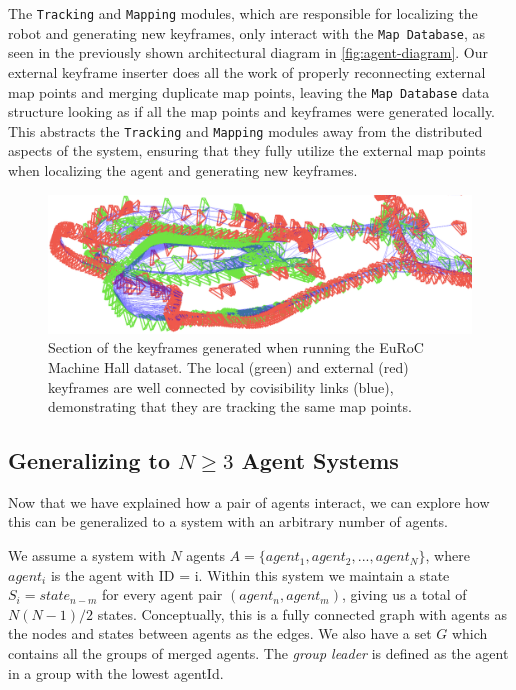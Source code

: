 The \texttt{Tracking} and \texttt{Mapping} modules, which are responsible for localizing the robot and generating new keyframes, only interact with the \texttt{Map Database}, as seen in the previously shown architectural diagram in \autoref{fig:agent-diagram}. Our external keyframe inserter does all the work of properly reconnecting external map points and merging duplicate map points, leaving the \texttt{Map Database} data structure looking as if all the map points and keyframes were generated locally. This abstracts the \texttt{Tracking} and \texttt{Mapping} modules away from the distributed aspects of the system, ensuring that they fully utilize the external map points when localizing the agent and generating new keyframes.


\begin{figure}[h]
    \centering
    \includegraphics[width=0.8\linewidth]{figures/map_integration.png}

    \caption{Section of the keyframes generated when running the EuRoC Machine Hall dataset. The local (green) and external (red) keyframes are well connected by covisibility links (blue), demonstrating that they are tracking the same map points.}
    \label{fig:simulation-environment}
\end{figure}

\subsection{Generalizing to $N \geq 3$ Agent Systems}
\label{sec:generalizing-to-n-geq-3-agent-systems}
Now that we have explained how a pair of agents interact, we can explore how this can be generalized to a system with an arbitrary number of agents.

We assume a system with $N$ agents $A=\{agent_1, agent_2, ..., agent_N\}$, where $agent_i$ is the agent with ID = i. Within this system we maintain a state $S_i=state_{n-m}$ for every agent pair $(agent_n, agent_m)$, giving us a total of $N(N-1)/2$ states. Conceptually, this is a fully connected graph with agents as the nodes and states between agents as the edges. We also have a set $G$ which contains all the groups of merged agents. The \textit{group leader} is defined as the agent in a group with the lowest agentId.

